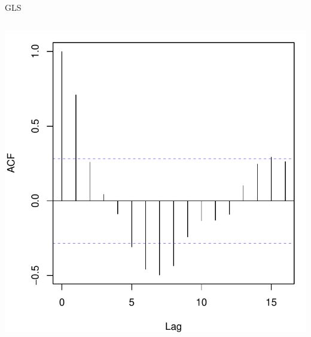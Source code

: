 \documentclass{beamer}\usepackage[]{graphicx}\usepackage[]{color}
\newenvironment{knitrout}{}{} %
\renewenvironment{knitrout}{\setlength{\topsep}{0mm}}{}
\begin{document}
\begin{frame}[fragile]{GLS}
\begin{columns}[c]
\begin{knitrout}
\includegraphics[width=0.7\linewidth]{figure/glspt2-2} 

\end{knitrout}

\end{columns}

\end{frame}
\end{document}
